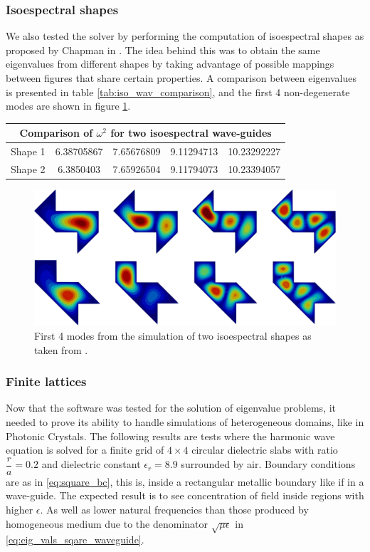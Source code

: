 \subsubsection{Isoespectral shapes}
We also tested the solver by performing the computation of isoespectral shapes as proposed by Chapman in \cite{Chapman1995}. The idea behind this was to obtain the same eigenvalues from different shapes by taking advantage of possible mappings between figures that share certain properties.
A comparison between eigenvalues is presented in table \ref{tab:iso_wav_comparison}, and the first 4 non-degenerate modes are shown in figure \ref{fig:isoespectral_waveguide}.
\begin{center}
\begin{tabular}{|c|c|c|c|c|}
\hline
\multicolumn{5}{|c|}{Comparison of $\omega^2$ for two isoespectral wave-guides} \\
\hline 
Shape 1  & 6.38705867 & 7.65676809 & 9.11294713 & 10.23292227 \\ 
\hline 
Shape 2 & 6.3850403 & 7.65926504 & 9.11794073 & 10.23394057 \\ 
\hline 
\end{tabular}
\label{tab:iso_wav_comparison}
\end{center}
\begin{figure}
\centering
\includegraphics[scale=0.1]{./img/isoespectral.pdf}
\caption{First 4 modes from the simulation of two isoespectral shapes as taken from \cite{Chapman1995}.}
\label{fig:isoespectral_waveguide}
\end{figure}

\subsubsection{Finite lattices}

Now that the software was tested for the solution of eigenvalue problems, it needed to prove its ability to handle simulations of heterogeneous domains, like in Photonic Crystals. The following results are tests where the harmonic wave equation is solved for a finite grid of $4\times 4$ circular dielectric slabs with ratio $\dfrac{r}{a}=0.2$ and dielectric constant $\epsilon_r = 8.9$ surrounded by air. Boundary conditions are as in \ref{eq:square_bc}, this is, inside a rectangular metallic boundary like if in a wave-guide. The expected result is to see concentration of field inside regions with higher $\epsilon$. As well as lower natural frequencies than those produced by homogeneous medium due to the denominator $\sqrt{\mu\epsilon}$ in \ref{eq:eig_vals_sqare_waveguide}. 

